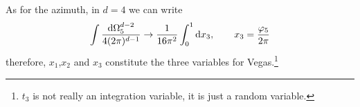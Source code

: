 \documentclass[a4paper,11pt]{article}
\begin{document}
As for the azimuth, in $d=4$ we can write
\begin{equation}
\int \frac{\mathrm d\Omega^{d-2}_5}{4(2\pi)^{d-1}} \to
\frac{1}{16\pi^2}\int^{1}_0 \mathrm d x_3, \quad\quad
x_3 = \frac{\varphi_5}{2\pi}
\end{equation}
therefore, $x_1$,$x_2$ and $x_3$ constitute the three variables
for Vegas.\footnote{$t_3$ is not really an integration variable, it is just a random variable.}
\end{document}
